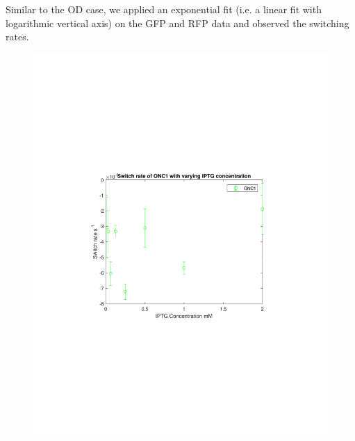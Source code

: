 \documentclass[english,11pt,a4paper]{article}
\begin{document}
Similar to the OD case, we applied an exponential fit (i.e. a linear fit with logarithmic vertical axis) on the GFP and RFP data and observed the switching rates. 


\begin{figure}[htbp]
\centering
\includegraphics[scale=0.8]{ONC1switchrate.pdf}
\caption{}
\label{fig:onc1SwitchRate}
\end{figure}
\end{document}
